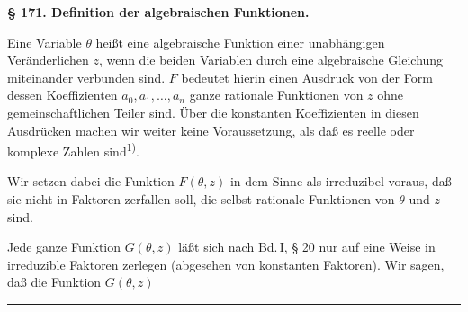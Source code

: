 
\begin{center}
\textbf{§ 171. Definition der algebraischen Funktionen.}
\end{center}

Eine Variable $\theta$ heißt eine algebraische Funktion einer
unabhängigen Veränderlichen $z$, wenn die beiden Variablen durch eine
algebraische Gleichung
miteinander verbunden sind. $F$ bedeutet hierin einen Ausdruck von der
Form
dessen Koeffizienten $a_0, a_1, \ldots, a_n$ ganze rationale Funktionen
von $z$ ohne gemeinschaftlichen Teiler sind. Über die konstanten
Koeffizienten in diesen Ausdrücken machen wir weiter keine
Voraussetzung, als daß es reelle oder komplexe Zahlen
sind\textsuperscript{1)}.

Wir setzen dabei die Funktion $F(\theta,z)$
in dem Sinne als irreduzibel voraus, daß sie nicht in Faktoren
zerfallen soll, die selbst rationale Funktionen von $\theta$ und $z$
sind.

Jede ganze Funktion $G(\theta,z)$ läßt sich nach Bd.\,I, § 20
nur auf eine Weise in irreduzible Faktoren zerlegen (abgesehen von
konstanten Faktoren). Wir sagen, daß die Funktion $G(\theta,z)$

\smallskip
\noindent\rule{5em}{0.4pt}

